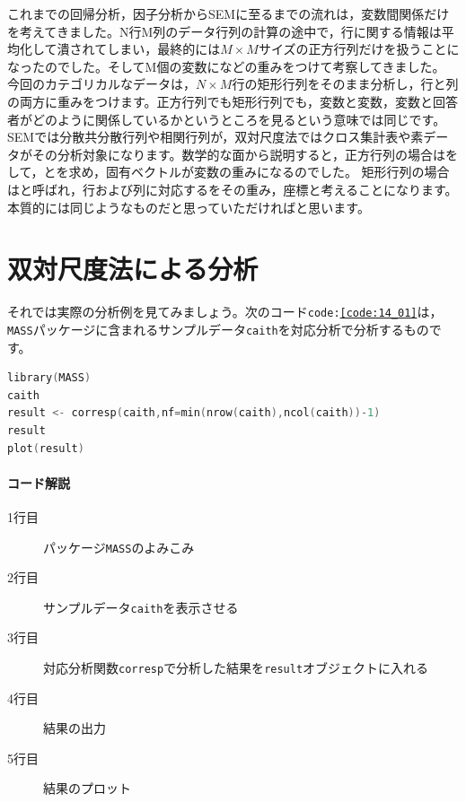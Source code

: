 \documentclass{ltjsbook}
\begin{document}
これまでの回帰分析，因子分析からSEMに至るまでの流れは，変数間関係だけを考えてきました。N行M列のデータ行列の計算の途中で，行に関する情報は平均化して潰されてしまい，最終的には$M \times M$サイズの正方行列だけを扱うことになったのでした。そしてM個の変数になどの重みをつけて考察してきました。
今回のカテゴリカルなデータは，$N\times M$行の矩形行列をそのまま分析し，行と列の両方に重みをつけます。正方行列でも矩形行列でも，変数と変数，変数と回答者がどのように関係しているかというところを見るという意味では同じです。SEMでは分散共分散行列や相関行列が，双対尺度法ではクロス集計表や素データがその分析対象になります。数学的な面から説明すると，正方行列の場合はをして，とを求め，固有ベクトルが変数の重みになるのでした。
矩形行列の場合はと呼ばれ，行および列に対応するをその重み，座標と考えることになります。本質的には同じようなものだと思っていただければと思います。

\section{双対尺度法による分析}
それでは実際の分析例を見てみましょう。次のコード\texttt{code:\ref{code:14_01}}は，\texttt{MASS}パッケージに含まれるサンプルデータ\texttt{caith}を対応分析で分析するものです。

\begin{lstlisting}[language=c++,label={code:14_01},caption={双対尺度法による分析}]
library(MASS)
caith
result <- corresp(caith,nf=min(nrow(caith),ncol(caith))-1)
result
plot(result)
\end{lstlisting}

\paragraph{コード解説}
\begin{description}
	\item[1行目] パッケージ\texttt{MASS}のよみこみ
	\item[2行目] サンプルデータ\texttt{caith}を表示させる
	\item[3行目] 対応分析関数\texttt{corresp}で分析した結果を\texttt{result}オブジェクトに入れる
	\item[4行目] 結果の出力
	\item[5行目] 結果のプロット
\end{description}
\end{document}
